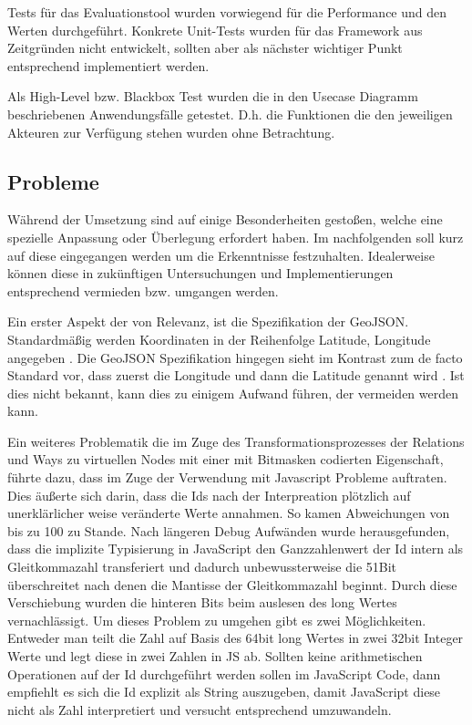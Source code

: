 Tests für das Evaluationstool wurden vorwiegend für die Performance und den Werten durchgeführt.
Konkrete Unit-Tests wurden für das Framework aus Zeitgründen nicht entwickelt, sollten aber als nächster wichtiger Punkt entsprechend implementiert werden.

Als High-Level bzw. Blackbox Test wurden die in den Usecase Diagramm beschriebenen Anwendungsfälle getestet. D.h. die Funktionen die den jeweiligen Akteuren zur Verfügung stehen wurden ohne Betrachtung.

\subsection*{Probleme}

Während der Umsetzung sind auf einige Besonderheiten gestoßen, welche eine spezielle Anpassung oder Überlegung erfordert haben. Im nachfolgenden soll kurz auf diese eingegangen werden um die Erkenntnisse festzuhalten. Idealerweise können diese in zukünftigen Untersuchungen und Implementierungen entsprechend vermieden bzw. umgangen werden.

Ein erster Aspekt der von Relevanz, ist die Spezifikation der GeoJSON. Standardmäßig werden Koordinaten in der Reihenfolge Latitude, Longitude angegeben \cite{Schoeneberger.2002,Barzegar.1996,Maling.1991,}. Die GeoJSON Spezifikation hingegen sieht im Kontrast zum de facto Standard vor, dass zuerst die Longitude und dann die Latitude genannt wird \cite{Butler.2008}. Ist dies nicht bekannt, kann dies zu einigem Aufwand führen, der vermeiden werden kann.

Ein weiteres Problematik die im Zuge des Transformationsprozesses der Relations und Ways zu virtuellen Nodes mit einer mit Bitmasken codierten Eigenschaft, führte dazu, dass im Zuge der Verwendung mit Javascript Probleme auftraten. Dies äußerte sich darin, dass die Ids nach der Interpreation plötzlich auf unerklärlicher weise veränderte Werte annahmen. So kamen Abweichungen von bis zu 100 zu Stande. Nach längeren Debug Aufwänden wurde herausgefunden, dass die implizite Typisierung in JavaScript den Ganzzahlenwert der Id intern als Gleitkommazahl transferiert und dadurch unbewussterweise die 51Bit überschreitet nach denen die Mantisse der Gleitkommazahl beginnt. Durch diese Verschiebung wurden die hinteren Bits beim auslesen des long Wertes vernachlässigt. Um dieses Problem zu umgehen gibt es zwei Möglichkeiten. Entweder man teilt die Zahl auf Basis des 64bit long Wertes in zwei 32bit Integer Werte und legt diese in zwei Zahlen in JS ab. Sollten keine arithmetischen Operationen auf der Id durchgeführt werden sollen im JavaScript Code, dann empfiehlt es sich die Id explizit als String auszugeben, damit JavaScript diese nicht als Zahl interpretiert und versucht entsprechend umzuwandeln.

